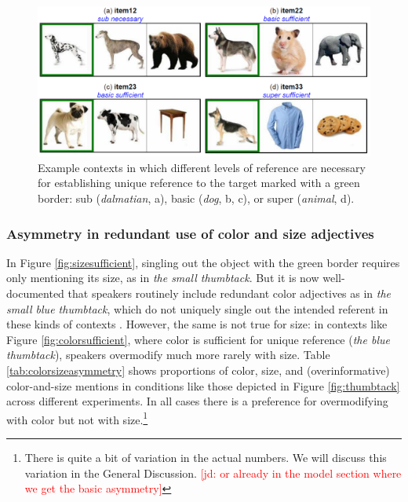 \documentclass[11pt]{article}
\newcommand{\jd}[1]{\textcolor{Red}{[jd: #1]}}
\newcommand{\tableref}[1]{Table \ref{#1}}
\newcommand{\figref}[1]{Figure \ref{#1}}
\begin{document}
\begin{figure}
\includegraphics[width=\textwidth]{pics/design}
\caption{Example contexts in which different levels of reference are necessary for establishing unique reference to the target marked with a green border: sub (\emph{dalmatian}, a), basic (\emph{dog}, b, c), or super (\emph{animal}, d).}
\label{fig:dogcontexts}
\end{figure}

\subsubsection{Asymmetry in redundant use of color and size adjectives}
\label{sec:asymmetry}

 In \figref{fig:sizesufficient}, singling out the object with the green border requires only mentioning its size, as in \emph{the small thumbtack}. But it is now well-documented that speakers routinely include redundant color adjectives as in \emph{the small blue thumbtack}, which do not uniquely single out the intended referent in these kinds of contexts \cite{Pechmann1989,  Belke2002, gatt2011}. However, the same is not true for size: in contexts like \figref{fig:colorsufficient}, where color is sufficient for unique reference (\emph{the blue thumbtack}), speakers overmodify much more rarely with size. \tableref{tab:colorsizeasymmetry} shows proportions of color, size, and (overinformative) color-and-size mentions in conditions like those depicted in \figref{fig:thumbtack} across different experiments. In all cases there is a preference for overmodifying with color but not with size.\footnote{There is quite a bit of variation in the actual numbers. We will discuss this variation in the General Discussion. \jd{or already in the model section where we get the basic asymmetry}}
 
\end{document}
